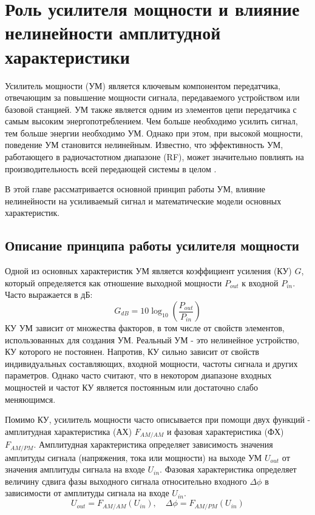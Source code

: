 \section{Роль усилителя мощности и влияние нелинейности амплитудной характеристики}
Усилитель мощности (УМ) является ключевым компонентом передатчика,
отвечающим за повышение мощности сигнала, передаваемого устройством или
базовой станцией. УМ также является одним из элементов цепи передатчика с
самым высоким энергопотреблением. Чем больше необходимо усилить сигнал, тем
больше энергии необходимо УМ. Однако при этом, при высокой мощности,
поведение УМ становится нелинейным. Известно, что эффективность УМ,
работающего в радиочастотном диапазоне (RF), может значительно повлиять на
производительность всей передающей системы
в целом \cite{Lie2018}.

В этой главе рассматривается основной принцип работы УМ, влияние
нелинейности на усиливаемый сигнал и математические модели основных
характеристик.


\subsection{Описание принципа работы усилителя мощности}
Одной из основных характеристик УМ является коэффициент усиления (КУ) $G$,
который определяется как отношение выходной мощности $P_{out}$ к входной
$P_{in}$. Часто выражается в дБ:
\begin{equation}
    G_{dB} = 10\log_{10}\left(\frac{P_{out}}{P_{in}}\right)
\end{equation}
КУ УМ зависит от множества факторов, в том числе от свойств элементов,
использованных для создания УМ. Реальный УМ - это нелинейное устройство, КУ
которого не постоянен. Напротив, КУ сильно зависит от свойств
индивидуальных составляющих, входной мощности, частоты сигнала и других
параметров. Однако часто считают, что в некотором диапазоне входных
мощностей и частот КУ является постоянным или достаточно слабо
меняющимся.

Помимо КУ, усилитель мощности часто описывается при помощи двух функций -
амплитудная характеристика (АХ) $F_{AM/AM}$ и фазовая характеристика (ФХ)
$F_{AM/PM}$. Амплитудная характеристика определяет зависимость значения
амплитуды сигнала (напряжения, тока или мощности) на выходе УМ $U_{out}$ от
значения амплитуды сигнала на входе $U_{in}$. Фазовая характеристика
определяет величину сдвига фазы выходного сигнала относительно входного
$\Delta\phi$ в зависимости от амплитуды сигнала на входе $U_{in}$.
\begin{equation}
    U_{out} = F_{AM/AM}(U_{in}), \quad \Delta\phi = F_{AM/PM}(U_{in})
\end{equation}

